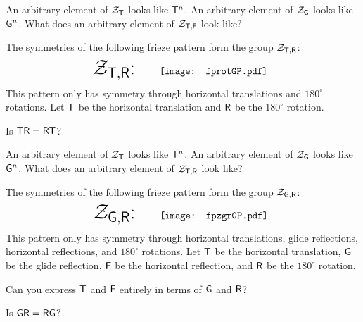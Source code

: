 \documentclass{ximera}
\begin{document}
\begin{question}
An arbitrary element of $\mathcal{Z}_\mathsf{T}$ looks like $\mathsf{T}^n$. An arbitrary
element of $\mathcal{Z}_\mathsf{G}$ looks like $\mathsf{G}^n$. What does an arbitrary element
of $\mathcal{Z}_{\mathsf{T},\mathsf{F}}$ look like?
\end{question}











The symmetries of the following frieze pattern form the group $\mathcal{Z}_{\mathsf{T},\mathsf{R}}$:
\[
\text{\huge $\Ztr$:}\qquad\begin{array}{c}
\texttt{[image: fprotGP.pdf]}
\end{array}
\]
This pattern only has symmetry through horizontal translations and
$180^\circ$ rotations. Let $\mathsf{T}$ be the horizontal translation and
$\mathsf{R}$ be the $180^\circ$ rotation.

\begin{question} Is $\mathsf{T}\mathsf{R} = \mathsf{R}\mathsf{T}$?
\end{question}

\begin{question}
An arbitrary element of $\mathcal{Z}_\mathsf{T}$ looks like $\mathsf{T}^n$. An arbitrary
element of $\mathcal{Z}_\mathsf{G}$ looks like $\mathsf{G}^n$. What does an arbitrary element
of $\mathcal{Z}_{\mathsf{T},\mathsf{R}}$ look like?
\end{question}








The symmetries of the following frieze pattern form the group $\mathcal{Z}_{\mathsf{G},\mathsf{R}}$:
\[
\text{\huge $\Zgr$:}\qquad\begin{array}{c}
\texttt{[image: fpzgrGP.pdf]}
\end{array}
\]
This pattern only has symmetry through horizontal translations, glide
reflections, horizontal reflections, and $180^\circ$ rotations. Let
$\mathsf{T}$ be the horizontal translation, $\mathsf{G}$ be the glide
reflection, $\mathsf{F}$ be the horizontal reflection, and $\mathsf{R}$ be
the $180^\circ$ rotation.

\begin{question} 
Can you express $\mathsf{T}$ and $\mathsf{F}$ entirely in terms of $\mathsf{G}$
and $\mathsf{R}$?
\end{question}

\begin{question} Is $\mathsf{G}\mathsf{R} = \mathsf{R}\mathsf{G}$?
\end{question}
\end{document}
